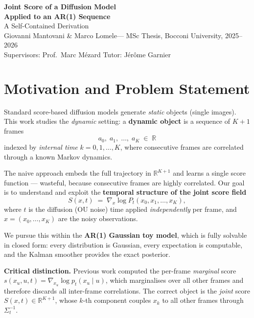 \documentclass[12pt, a4paper]{article}
\def\bx{x}%
\def\bm#1{#1}%
\theoremstyle{definition}
\newcommand{\R}{\mathbb{R}}
\newcommand{\bx}{\bm{x}}
\begin{document}

\begin{center}
  {\LARGE\bfseries Joint Score of a Diffusion Model\\[4pt]
  Applied to an AR(1) Sequence}\\[12pt]
  {\large A Self-Contained Derivation}\\[6pt]
  {\normalsize Giovanni Mantovani \& Marco Lomele\quad—\quad
  MSc Thesis, Bocconi University, 2025--2026}\\[4pt]
  {\small Supervisors: Prof.\ Marc M\'ezard \quad Tutor: J\'er\^ome Garnier}
\end{center}

\vspace{0.5cm}
\tableofcontents
\vspace{0.8cm}

\section{Motivation and Problem Statement}

Standard score-based diffusion models generate \emph{static} objects
(single images). This work studies the \emph{dynamic} setting: a
\textbf{dynamic object} is a sequence of $K+1$ frames
\[
  a_0,\; a_1,\; \ldots,\; a_K \;\in\; \R
\]
indexed by \emph{internal time} $k = 0, 1, \ldots, K$, where consecutive
frames are correlated through a known Markov dynamics.

The naive approach embeds the full trajectory in $\R^{K+1}$ and learns a
single score function — wasteful, because consecutive frames are highly
correlated. Our goal is to understand and exploit the \textbf{temporal
structure of the joint score field}
\[
  \bm{S}(\bx, t)
  \;=\;
  \nabla_{\bx}\log P_t(x_0, x_1, \ldots, x_K),
\]
where $t$ is the diffusion (OU noise) time applied \emph{independently} per
frame, and $\bx = (x_0, \ldots, x_K)$ are the noisy observations.

We pursue this within the \textbf{AR(1) Gaussian toy model}, which is
fully solvable in closed form: every distribution is Gaussian, every
expectation is computable, and the Kalman smoother provides the exact
posterior.

\begin{remarkbox}
\textbf{Critical distinction.} Previous work computed the per-frame
\emph{marginal} score $s(x_u, u, t) = \nabla_{x_u}\log p_t(x_u \mid u)$,
which marginalises over all other frames and therefore discards all
inter-frame correlations. The correct object is the \emph{joint} score
$\bm{S}(\bx, t) \in \R^{K+1}$, whose $k$-th component couples $x_k$ to
all other frames through $\Sigma_t^{-1}$.
\end{remarkbox}
\end{document}
